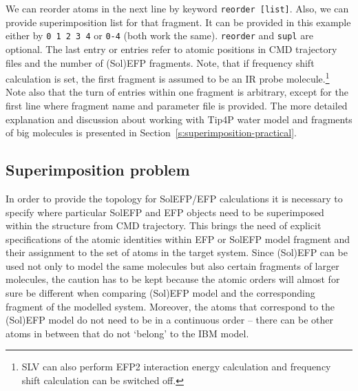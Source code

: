 \documentclass[a4paper,titlepage,twoside,fleqn,12pt]{book}
\begin{document}
\begin{refsection}
We can reorder atoms in the next line
by keyword {\tt reorder [list]}. Also, we can provide 
superimposition list for that fragment. It can be
provided in this example either by {\tt 0 1 2 3 4} 
or {\tt 0-4} (both work the same). {\tt reorder} and {\tt supl} are
optional. The last entry or entries refer to atomic positions in CMD trajectory 
files and the number of
(Sol)EFP fragments. Note, that if frequency shift calculation is set, the first fragment
is assumed to be an IR probe molecule.\footnote{SLV can also perform
EFP2 interaction energy calculation and frequency shift calculation
can be switched off.} 
Note also that the turn of entries within one fragment is
arbitrary, except for the first line where fragment name and parameter file is provided. The more
detailed explanation and discussion about working with Tip4P water model and fragments of big
molecules is presented in Section~\ref{s:superimposition-practical}.



\subsection{Superimposition problem\label{s:superimposition-practical}}

In order to provide the topology for SolEFP/EFP calculations it is necessary to specify where particular
SolEFP and EFP objects need to be superimposed within the structure from CMD trajectory. This brings
the need of explicit specifications of the atomic identities within EFP or SolEFP model fragment and their
assignment to the set of atoms in the target system. Since (Sol)EFP can be used not only to model
the same molecules but also certain fragments of larger molecules, the caution has to be kept because
the atomic orders will almost for sure be different when comparing (Sol)EFP model and the
corresponding fragment of the modelled system. Moreover, the atoms that correspond to the
(Sol)EFP model do not need to be in a continuous order -- there can be other atoms in between that
do not `belong' to the IBM model.


\end{refsection}
\end{document}
